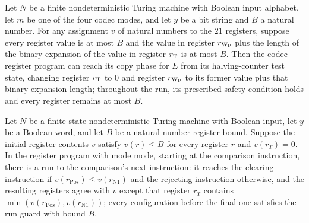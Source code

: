 \begin{theorem}
\label{Complexity.Codec.hc_run}
\leanok
{}
Let $N$ be a finite nondeterministic Turing machine with Boolean input alphabet, let $m$
be one of the four codec modes, and let $y$ be a bit string and $B$ a natural number.
For any assignment $v$ of natural numbers to the $21$ registers, suppose every register
value is at most $B$ and the value in register $r_{\rm Wp}$ plus the length of the binary
expansion of the value in register $r_{\rm T}$ is at most $B$. Then the codec register
program can reach its copy phase for $E$ from its halving-counter test state, changing
register $r_{\rm T}$ to $0$ and register $r_{\rm Wp}$ to its former value plus that binary
expansion length; throughout the run, its prescribed safety condition holds and every
register remains at most $B$.
\end{theorem}

\begin{theorem}
\label{Complexity.Codec.le_run}
\leanok
{}
Let $N$ be a finite-state nondeterministic Turing machine with Boolean input, let $y$ be
a Boolean word, and let $B$ be a natural-number register bound. Suppose the initial
register contents $v$ satisfy $v(r)\le B$ for every register $r$ and $v(r_T)=0$. In the
register program with mode $\mathrm{mode}$, starting at the comparison instruction,
there is a run to the comparison’s next instruction: it reaches the clearing instruction
if $v(r_{\mathrm{Pos}})\le v(r_{\mathrm{N1}})$ and the rejecting instruction otherwise,
and the resulting registers agree with $v$ except that register $r_T$ contains
$\min(v(r_{\mathrm{Pos}}),v(r_{\mathrm{N1}}))$; every configuration before the final one
satisfies the run guard with bound $B$.
\end{theorem}

